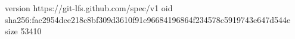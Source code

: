 version https://git-lfs.github.com/spec/v1
oid sha256:fac2954dce218c8bf309d3610f91e96684196864f234578c5919743e647d544e
size 53410
